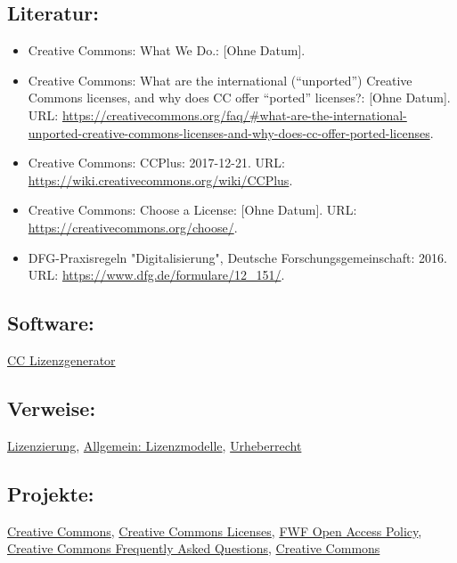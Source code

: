 \documentclass{article}
\begin{document}
        \subsection*{Literatur:}\begin{itemize}\item Creative Commons: What We Do.: [Ohne Datum].\item Creative Commons: What are the international (“unported”) Creative Commons
                              licenses, and why does CC offer “ported” licenses?: [Ohne Datum]. URL: \url{https://creativecommons.org/faq/#what-are-the-international-unported-creative-commons-licenses-and-why-does-cc-offer-ported-licenses}.\item Creative Commons: CCPlus: 2017-12-21. URL: \url{https://wiki.creativecommons.org/wiki/CCPlus}.\item Creative Commons: Choose a License: [Ohne Datum]. URL: \url{https://creativecommons.org/choose/}.\item DFG-Praxisregeln "Digitalisierung", Deutsche Forschungsgemeinschaft: 2016. URL: \url{https://www.dfg.de/formulare/12_151/}.\end{itemize}\subsection*{Software:}\href{Vectr}{CC Lizenzgenerator}\subsection*{Verweise:}\href{https://gams.uni-graz.at/o:konde.119}{Lizenzierung}, \href{https://gams.uni-graz.at/o:konde.9}{Allgemein: Lizenzmodelle}, \href{https://gams.uni-graz.at/o:konde.44}{Urheberrecht}\subsection*{Projekte:}\href{https://creativecommons.org}{Creative
                           Commons}, \href{https://creativecommons.org/use-remix/cc-licenses/}{Creative
                           Commons Licenses}, \href{https://www.fwf.ac.at/de/forschungsfoerderung/open-access-policy/}{FWF Open Access Policy}, \href{https://creativecommons.org/faq/}{Creative
                           Commons Frequently Asked Questions}, \href{https://wiki.creativecommons.org/wiki/Main_Page}{Creative Commons
}
\end{document}
